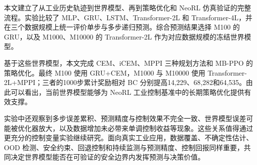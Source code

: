 本文建立了从工业历史轨迹到世界模型、再到策略优化和 NeoRL 仿真验证的完整流程。实验比较了 MLP、GRU、LSTM、Transformer-2L 和 Transformer-4L，并在三个数据规模上统一评价单步与多步递归预测。综合预测结果选择 M100 的 GRU，以及 M1000、M10000 的 Transformer-2L 作为对应数据规模的冻结世界模型。

基于这些世界模型，本文完成 CEM、iCEM、MPPI 三种规划方法和 MB-PPO 的策略优化。最终 M100 使用 GRU+CEM，M1000 与 M10000 使用 Transformer-2L+MPPI；三者的1000步累计奖励相对 BC 分别提高14,229、68,282和64,535。由此可以看出，当前世界模型能够为 NeoRL 工业控制基准中的长期策略优化提供有效支撑。

实验中还观察到多步误差累积、预测精度与控制效果不完全一致、世界模型误差可能被优化器放大，以及数据增加未必带来单调控制收益等现象。这些关系值得通过更充分的控制变量实验继续研究。面向真实工业应用，数据覆盖、不确定性估计、OOD 检测、安全约束、回退控制和持续监测与预测精度、控制回报同样重要，共同决定世界模型能否在可验证的安全边界内发挥预测与决策价值。

